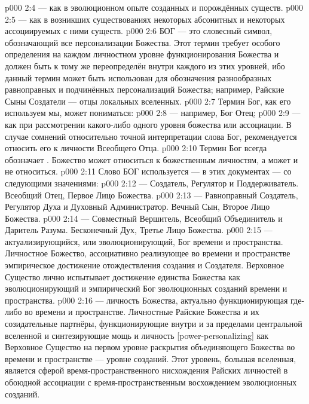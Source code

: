 \vs p000 2:4  --- как в эволюционном опыте созданных и порождённых существ.
\vs p000 2:5  --- как в возникших существованиях некоторых абсонитных и некоторых ассоциируемых с ними существ.
\vs p000 2:6 БОГ --- это словесный символ, обозначающий все персонализации Божества. Этот термин требует особого определения на каждом личностном уровне функционирования Божества и должен быть к тому же переопределён внутри каждого из этих уровней, ибо данный термин может быть использован для обозначения разнообразных равноправных и подчинённых персонализаций Божества; например, Райские Сыны Создатели --- отцы локальных вселенных.
\vs p000 2:7 \pc Термин Бог, как его используем мы, может пониматься:
\vs p000 2:8  --- например, Бог Отец;
\vs p000 2:9  --- как при рассмотрении какого\hyp{}либо одного уровня божества или ассоциации. В случае сомнений относительно точной интерпретации слова Бог, рекомендуется относить его к личности Всеобщего Отца.
\vs p000 2:10 \pc Термин Бог всегда обозначает . Божество может относиться к божественным личностям, а может и не относиться.
\vs p000 2:11 \pc Слово БОГ используется --- в этих документах --- со следующими значениями:
\vs p000 2:12  --- Создатель, Регулятор и Поддерживатель. Всеобщий Отец, Первое Лицо Божества.
\vs p000 2:13  --- Равноправный Создатель, Регулятор Духа и Духовный Администратор. Вечный Сын, Второе Лицо Божества.
\vs p000 2:14  --- Совместный Вершитель, Всеобщий Объединитель и Даритель Разума. Бесконечный Дух, Третье Лицо Божества.
\vs p000 2:15  --- актуализирующийся, или эволюционирующий, Бог времени и пространства. Личностное Божество, ассоциативно реализующее во времени и пространстве эмпирическое достижение отождествления создания и Создателя. Верховное Существо лично испытывает достижение единства Божества как эволюционирующий и эмпирический Бог эволюционных созданий времени и пространства.
\vs p000 2:16  --- личность Божества, актуально функционирующая где\hyp{}либо во времени и пространстве. Личностные Райские Божества и их созидательные партнёры, функционирующие внутри и за пределами центральной вселенной и синтезирующие мощь и личность [power\hyp{}personalizing] как Верховное Существо на первом уровне раскрытия объединяющего Божества во времени и пространстве --- уровне созданий. Этот уровень, большая вселенная, является сферой время\hyp{}пространственного нисхождения Райских личностей в обоюдной ассоциации с время\hyp{}пространственным восхождением эволюционных созданий.
